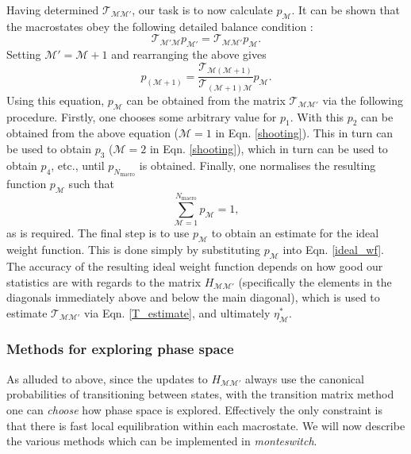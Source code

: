 \documentclass{report}
\begin{document}
Having determined  $\mathcal{T}_{\mathcal{MM}'}$, our task is to now calculate $p_{\mathcal{M}}$. It can be shown that the macrostates obey the following
detailed balance condition \cite{Smith_1995}:
\begin{equation}
\mathcal{T}_{\mathcal{M}'\mathcal{M}}p_{\mathcal{M}'}=\mathcal{T}_{\mathcal{MM}'}p_{\mathcal{M}}.
\end{equation}
Setting $\mathcal{M}'=\mathcal{M}+1$ and rearranging the above gives
\begin{equation}\label{shooting}
p_{(\mathcal{M}+1)}=\frac{\mathcal{T}_{\mathcal{M}(\mathcal{M}+1)}}{\mathcal{T}_{(\mathcal{M}+1)\mathcal{M}}}p_{\mathcal{M}}.
\end{equation}
Using this equation, $p_{\mathcal{M}}$ can be obtained from the matrix $\mathcal{T}_{\mathcal{M}\mathcal{M}'}$ via the following procedure.
Firstly, one chooses some arbitrary value for $p_1$. With this $p_2$ can be obtained from the above equation ($\mathcal{M}=1$ in Eqn. \eqref{shooting}). 
This in turn can be used to obtain $p_3$ ($\mathcal{M}=2$ in Eqn. \eqref{shooting}), which in turn can be used to obtain $p_4$, etc., until
$p_{N_{\text{macro}}}$ is obtained. Finally, one normalises the resulting function $p_{\mathcal{M}}$ such that
\begin{equation}
\sum_{\mathcal{M}=1}^{N_{\text{macro}}}p_{\mathcal{M}}=1,
\end{equation}
as is required. The final step is to use $p_{\mathcal{M}}$ to obtain an estimate for the ideal weight function. This is done simply by substituting 
$p_{\mathcal{M}}$ into Eqn. \eqref{ideal_wf}. The accuracy of the resulting ideal weight function depends on how good our statistics are with regards to
the matrix $H_{\mathcal{M}\mathcal{M}'}$ (specifically the elements in the diagonals immediately above and below the main diagonal), which is used to
estimate $\mathcal{T}_{\mathcal{M}\mathcal{M}'}$ via Eqn. \eqref{T_estimate}, and ultimately $\eta^*_{\mathcal{M}}$. 


\subsubsection{Methods for exploring phase space}
As alluded to above, since the updates to $H_{\mathcal{M}\mathcal{M}'}$ always use the canonical probabilities of transitioning between states, 
with the transition matrix method one can \emph{choose} how phase space is explored. Effectively the only constraint is that there is fast local 
equilibration within each macrostate. We will now describe the various methods which can be implemented in \emph{monteswitch}.
\end{document}
